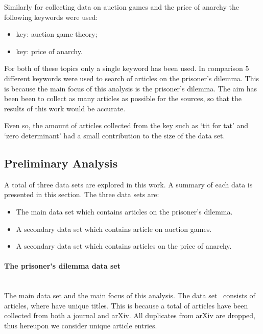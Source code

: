 \documentclass{article}
\theoremstyle{definition}
\newcommand{\totalarticles}{}
\newcommand{\uniquetitles}{}
\newcommand{\numberofduplicates}{}
\begin{document}
Similarly for collecting data on auction games and the price of anarchy the
following keywords were used:

\begin{itemize}
    \item key: auction game theory;
    \item key: price of anarchy.
\end{itemize}

For both of these topics only a single keyword has been used. In comparison 5
different keywords were used to search of articles on the prisoner's dilemma.
This is because the main focus of this analysis is the prisoner's dilemma. The
aim has been been to collect as many articles as possible for the sources, so
that the results of this work would be accurate.

Even so, the amount of articles collected from the key such as `tit for tat' and
`zero determinant' had a small contribution to the size of the data set.

\subsection{Preliminary Analysis}

A total of three data sets are explored in this work. A summary of each data is
presented in this section. The three data sets are:

\begin{itemize}
    \item The main data set which contains articles on the prisoner's dilemma.
    \item A secondary data set which contains article on auction games.
    \item A secondary data set which contains articles on the price of anarchy.
\end{itemize}

\paragraph{The prisoner's dilemma data set}
\mbox{ }\\

The main data set and the main focus of this analysis. The data set~\cite{}
consists of \totalarticles articles, where \uniquetitles have unique titles.
This is because a total of \numberofduplicates articles have been collected from
both a journal and arXiv. All duplicates from arXiv are dropped, thus hereupon
we consider \uniquetitles unique article entries.
\end{document}
